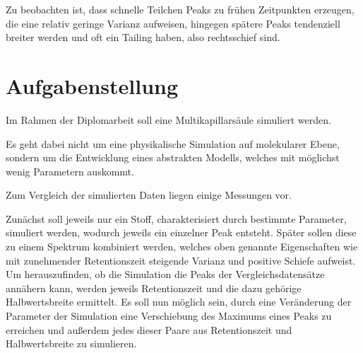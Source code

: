 \documentclass[a4paper,10pt]{article}
\begin{document}


Zu beobachten ist, dass schnelle Teilchen Peaks zu frühen Zeitpunkten erzeugen, die eine relativ geringe Varianz aufweisen, hingegen spätere Peaks tendenziell breiter werden und oft ein Tailing haben, also rechtsschief sind. 

\section{Aufgabenstellung}

Im Rahmen der Diplomarbeit soll eine Multikapillarsäule simuliert werden. 

Es geht dabei nicht um eine physikalische Simulation auf molekularer Ebene, sondern um die Entwicklung eines abstrakten Modells, welches mit möglichst wenig Parametern auskommt. %

Zum Vergleich der simulierten Daten liegen einige Messungen vor. 

Zunächst soll jeweils nur ein Stoff, charakterisiert durch bestimmte Parameter, simuliert werden, wodurch jeweils ein einzelner Peak entsteht. Später sollen diese zu einem Spektrum kombiniert werden, welches oben genannte Eigenschaften wie mit zunehmender Retentionszeit steigende Varianz und positive Schiefe
aufweist. 
Um herauszufinden, ob die Simulation die Peaks der Vergleichsdatensätze annähern kann, werden jeweils Retentionszeit und die dazu gehörige Halbwertsbreite ermittelt.
Es soll nun möglich sein, durch eine Veränderung der Parameter der Simulation eine Verschiebung des Maximums eines Peaks zu erreichen und außerdem jedes dieser Paare aus Retentionszeit und Halbwertsbreite zu simulieren.
\end{document}

